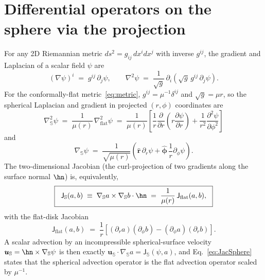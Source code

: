 \documentclass[11pt]{article}
\newcommand{\Lap}{\nabla^2}
\newcommand{\Lapproj}{\nabla^2_{\!\mathrm{flat}}}
\newcommand{\Lapsphere}{\nabla^2_{\!\mathbb{S}}}
\newcommand{\Jflat}{\mathsf{J}_{\mathrm{flat}}}
\newcommand{\Jsphere}{\mathsf{J}_{\mathbb{S}}}
\newcommand{\bu}{\bm{u}}
\newcommand{\hr}{\hat{\bm{r}}}
\newcommand{\hphi}{\hat{\bm{\phi}}}
\begin{document}
\section{Differential operators on the sphere via the projection}
\label{sec:operators}

For any 2D Riemannian metric $ds^{2} = g_{ij}\,dx^{i}dx^{j}$ with
inverse $g^{ij}$, the gradient and Laplacian of a scalar field $\psi$
are
\begin{equation}
  (\nabla \psi)^{i} \;=\; g^{ij}\,\partial_{j}\psi,
  \qquad
  \Lap \psi \;=\; \frac{1}{\sqrt{g}}\,\partial_{i}\!\left(
  \sqrt{g}\,g^{ij}\,\partial_{j}\psi\right).
  \label{eq:LaplaceBeltrami}
\end{equation}
For the conformally-flat metric~\eqref{eq:metric}, $g^{ij} =
\mu^{-1}\delta^{ij}$ and $\sqrt{g} = \mu r$, so the spherical
Laplacian and gradient in projected $(r, \phi)$ coordinates are
\begin{equation}
  \boxed{\;\;
  \Lapsphere \psi \;=\; \frac{1}{\mu(r)}\,\Lapproj \psi
  \;=\; \frac{1}{\mu(r)}\!\left[
  \frac{1}{r}\frac{\partial}{\partial r}\!\left(r\frac{\partial \psi}{\partial r}\right)
  + \frac{1}{r^{2}}\frac{\partial^{2}\psi}{\partial\phi^{2}}
  \right]
  \;\;}
  \label{eq:LapSphere}
\end{equation}
and
\begin{equation}
  \nabla_{\mathbb{S}} \psi
  \;=\; \frac{1}{\sqrt{\mu(r)}}\!\left(
  \hr\,\partial_{r}\psi + \hphi\,\frac{1}{r}\partial_{\phi}\psi\right).
  \label{eq:gradSphere}
\end{equation}
The two-dimensional Jacobian (the curl-projection of two gradients
along the surface normal $\hn$) is, equivalently,
\begin{equation}
  \boxed{\;\;
  \Jsphere(a, b)
  \;\equiv\; \nabla_{\mathbb{S}} a \times \nabla_{\mathbb{S}} b \cdot \hn
  \;=\; \frac{1}{\mu(r)}\,\Jflat(a, b),
  \;\;}
  \label{eq:JacSphere}
\end{equation}
with the flat-disk Jacobian
\begin{equation}
  \Jflat(a, b)
  \;=\; \frac{1}{r}\!\left[(\partial_{r} a)(\partial_{\phi} b)
  - (\partial_{\phi} a)(\partial_{r} b)\right].
  \label{eq:JacFlat}
\end{equation}
A scalar advection by an incompressible spherical-surface velocity
$\bu_{\mathbb{S}} = \hn \times \nabla_{\mathbb{S}}\psi$ is then
exactly $\bu_{\mathbb{S}} \cdot \nabla_{\mathbb{S}} a = \Jsphere(\psi, a)$,
and Eq.~\eqref{eq:JacSphere} states that the spherical advection
operator is the flat advection operator scaled by $\mu^{-1}$.
\end{document}
